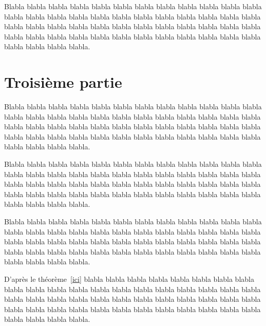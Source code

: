 \documentclass[a4paper]{article}
\begin{document}
Blabla blabla blabla blabla blabla blabla blabla blabla blabla blabla blabla blabla blabla
blabla blabla blabla blabla blabla blabla blabla blabla blabla blabla blabla blabla blabla
blabla blabla blabla blabla blabla blabla blabla blabla blabla blabla blabla blabla blabla
blabla blabla blabla blabla blabla blabla blabla blabla blabla blabla blabla blabla blabla.


\section{Troisième partie}

Blabla blabla blabla blabla blabla blabla blabla blabla blabla blabla blabla blabla blabla
blabla blabla blabla blabla blabla blabla blabla blabla blabla blabla blabla blabla blabla
blabla blabla blabla blabla blabla blabla blabla blabla blabla blabla blabla blabla blabla
blabla blabla blabla blabla blabla blabla blabla blabla blabla blabla blabla blabla blabla.

Blabla blabla blabla blabla blabla blabla blabla blabla blabla blabla blabla blabla blabla
blabla blabla blabla blabla blabla blabla blabla blabla blabla blabla blabla blabla blabla
blabla blabla blabla blabla blabla blabla blabla blabla blabla blabla blabla blabla blabla
blabla blabla blabla blabla blabla blabla blabla blabla blabla blabla blabla blabla blabla.

Blabla blabla blabla blabla blabla blabla blabla blabla blabla blabla blabla blabla blabla
blabla blabla blabla blabla blabla blabla blabla blabla blabla blabla blabla blabla blabla
blabla blabla blabla blabla blabla blabla blabla blabla blabla blabla blabla blabla blabla
blabla blabla blabla blabla blabla blabla blabla blabla blabla blabla blabla blabla blabla.

D'après le théorème~\ref{ici} blabla blabla blabla blabla blabla blabla blabla blabla blabla
blabla blabla blabla blabla blabla blabla blabla blabla blabla blabla blabla blabla blabla
blabla blabla blabla blabla blabla blabla blabla blabla blabla blabla blabla blabla blabla
blabla blabla blabla blabla blabla blabla blabla blabla blabla blabla blabla blabla blabla.
\end{document}
